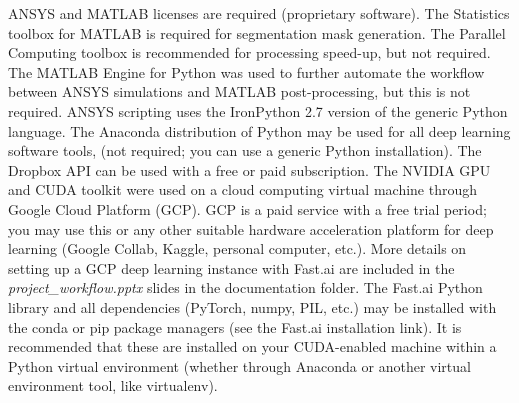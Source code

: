 \documentclass[11pt,letterpaper]{article}
\begin{document}
		ANSYS and MATLAB licenses are required (proprietary software). The Statistics toolbox for MATLAB is required for segmentation mask generation. The Parallel Computing toolbox is recommended for processing speed-up, but not required. The MATLAB Engine for Python was used to further automate the workflow between ANSYS simulations and MATLAB post-processing, but this is not required. ANSYS scripting uses the IronPython 2.7 version of the generic Python language. The Anaconda distribution of Python may be used for all deep learning software tools, (not required; you can use a generic Python installation). The Dropbox API can be used with a free or paid subscription. The NVIDIA GPU and CUDA toolkit were used on a cloud computing virtual machine through Google Cloud Platform (GCP). GCP is a paid service with a free trial period; you may use this or any other suitable hardware acceleration platform for deep learning (Google Collab, Kaggle, personal computer, etc.). More details on setting up a GCP deep learning instance with Fast.ai are included in the \textit{project\_workflow.pptx} slides in the documentation folder. The Fast.ai Python library and all dependencies (PyTorch, numpy, PIL, etc.) may be installed with the conda or pip package managers (see the Fast.ai installation link). It is recommended that these are installed on your CUDA-enabled machine within a Python virtual environment (whether through Anaconda or another virtual environment tool, like virtualenv).
		
\end{document}
